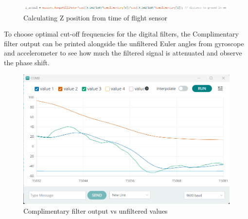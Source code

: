 \begin{figure}[H]
    \begin{center}
    \includegraphics[scale = 0.85]{pictures/IMU/Z_actual_trinagulation.png}
    \end{center}
    \caption{Calculating Z position from time of flight sensor}
    \label{fig:my_label}
\end{figure}



To choose optimal cut-off frequencies for the digital filters, the Complimentary filter output can be printed alongside the unfiltered Euler angles from gyroscope and accelerometer to see how much the filtered signal is attenuated and observe the phase shift. 


\begin{figure}[H]
    \begin{center}
    \includegraphics[scale = 0.65]{pictures/IMU/M5.png}
    \end{center}
    \caption{Complimentary filter output vs unfiltered values}
    \label{fig:my_label}
\end{figure}
